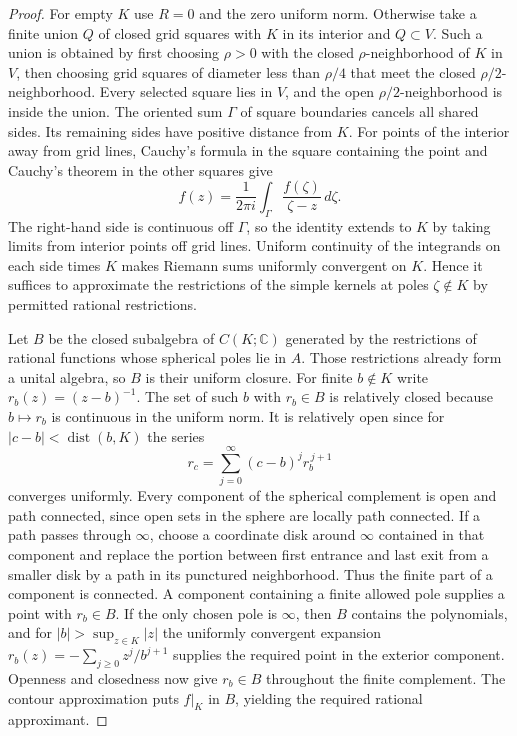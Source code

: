 \documentclass[11pt,oneside,openany]{book}
\theoremstyle{definition}
\theoremstyle{remark}
\begin{document}
\begin{proof}
For empty $K$ use $R=0$ and the zero uniform norm. Otherwise take
a finite union $Q$ of closed grid squares with $K$ in its interior
and $Q\subset V$. Such a union is obtained by first choosing
$\rho>0$ with the closed $\rho$-neighborhood of $K$ in $V$, then
choosing grid squares of diameter less than $\rho/4$ that meet the
closed $\rho/2$-neighborhood. Every selected square lies in $V$,
and the open $\rho/2$-neighborhood is inside the union. The oriented
sum $\Gamma$ of square boundaries cancels all shared sides. Its
remaining sides have positive distance from $K$. For points of
the interior away from grid lines, Cauchy's formula in the square
containing the point and Cauchy's theorem in the other squares
give
\[
 f(z)=\frac{1}{2\pi i}\int_\Gamma\frac{f(\zeta)}{\zeta-z}\,d\zeta .
\]
The right-hand side is continuous off $\Gamma$, so the identity
extends to $K$ by taking limits from interior points off grid lines.
Uniform continuity of the integrands on each side times $K$ makes
Riemann sums uniformly convergent on $K$. Hence it suffices to
approximate the restrictions of the simple kernels at poles
$\zeta\notin K$ by permitted rational restrictions.

Let $B$ be the closed subalgebra of $C(K;\mathbb C)$ generated by
the restrictions of rational functions whose spherical poles lie in
$A$. Those restrictions already form a unital algebra, so $B$ is
their uniform closure. For finite $b\notin K$ write $r_b(z)=(z-b)^{-1}$.
The set of such $b$ with $r_b\in B$ is relatively closed because
$b\mapsto r_b$ is continuous in the uniform norm. It is relatively
open since for $|c-b|<\operatorname{dist}(b,K)$ the series
\[
 r_c=\sum_{j=0}^{\infty}(c-b)^j r_b^{\,j+1}
\]
converges uniformly. Every component of the spherical complement
is open and path connected, since open sets in the sphere are
locally path connected. If a path passes through $\infty$, choose
a coordinate disk around $\infty$ contained in that component and
replace the portion between first entrance and last exit from a
smaller disk by a path in its punctured neighborhood. Thus the
finite part of a component is connected. A component containing
a finite allowed pole supplies a point with $r_b\in B$. If the
only chosen pole is $\infty$, then $B$ contains the polynomials,
and for $|b|>\sup_{z\in K}|z|$ the uniformly convergent expansion
$r_b(z)=-\sum_{j\ge0}z^j/b^{j+1}$ supplies the required point in
the exterior component. Openness and closedness now give $r_b\in B$
throughout the finite complement. The contour approximation puts
$f|_K$ in $B$, yielding the required rational approximant.
\end{proof}
\end{document}
